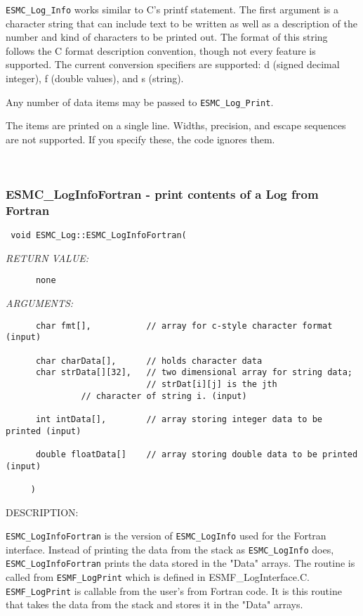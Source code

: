    {\tt ESMC\_Log\_Info} works similar to C's printf statement.
   The first argument is a character string that can include text to be
   written as well as a description of the number and kind of characters
   to be printed out.
   The format of this string follows the C format description convention,
   though not every feature is supported.  The current conversion specifiers
   are supported: d (signed decimal integer), f (double values),
   and s (string).
  
   Any number of data items may be passed to {\tt ESMC\_Log\_Print}.
   
   The items are printed on a single line.  Widths, precision, and
   escape sequences are not supported.  If you specify these, the code
   ignores them.
   
 
\mbox{}\hrulefill\ 
 
\subsubsection [ESMC\_LogInfoFortran] {ESMC\_LogInfoFortran - print contents of a Log from Fortran}


  
\begin{verbatim} 
 void ESMC_Log::ESMC_LogInfoFortran(
 \end{verbatim}{\em RETURN VALUE:}
\begin{verbatim}      none\end{verbatim}{\em ARGUMENTS:}
\begin{verbatim}      
      char fmt[],           // array for c-style character format (input)
 
      char charData[],      // holds character data
      char strData[][32],   // two dimensional array for string data;
                            // strDat[i][j] is the jth
 			   // character of string i. (input)
 
      int intData[],        // array storing integer data to be printed (input)
 
      double floatData[]    // array storing double data to be printed (input) 
 
     )\end{verbatim}
{\sf DESCRIPTION:\\ }


   {\tt ESMC\_LogInfoFortran} is the version of {\tt ESMC\_LogInfo} used for the Fortran
   interface.  Instead of printing the data from the stack as {\tt ESMC\_LogInfo} 
   does, {\tt ESMC\_LogInfoFortran} prints the data stored in the "Data" arrays. 
   The routine is called from {\tt ESMF\_LogPrint} which is  defined in
   ESMF\_LogInterface.C.  {\tt ESMF\_LogPrint} is callable from the user's
   from Fortran code.  It is this routine that takes the data
   from the stack and stores it in the "Data" arrays.
  

